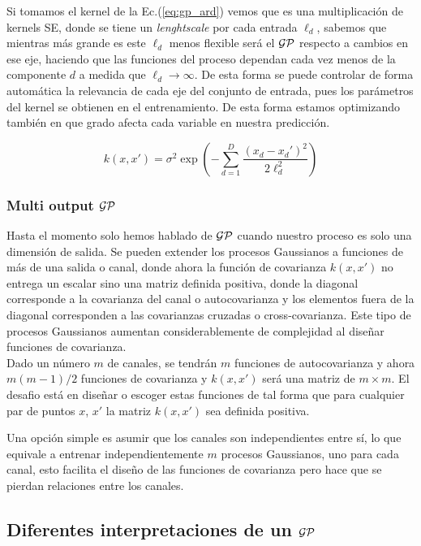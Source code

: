 Si tomamos el kernel de la Ec.(\ref{eq:gp_ard}) vemos que es una multiplicación de kernels SE, donde se tiene un \textit{lenghtscale} por cada entrada $\ell_d$, sabemos que mientras más grande es este $\ell_d$ menos flexible será el $\mathcal{GP}$ respecto a cambios en ese eje, haciendo que las funciones del proceso dependan cada vez menos de la componente $d$ a medida que $\ell_d \rightarrow \infty$. De esta forma se puede controlar de forma automática la relevancia de cada eje del conjunto de entrada, pues los parámetros del kernel se obtienen en el entrenamiento. De esta forma estamos optimizando también en que grado afecta cada variable en nuestra predicción.

\begin{equation}\label{eq:gp_ard}
	k(x, x') = \sigma^2 \exp\left( -\sum_{d=1}^{D} \frac{(x_d - x_d')^2}{2\ell_d^2}\right)
\end{equation}


\subsubsection{Multi output $\mathcal{GP}$}
Hasta el momento solo hemos hablado de $\mathcal{GP}$ cuando nuestro proceso es solo una dimensión de salida. Se pueden extender los procesos Gaussianos a funciones de más de una salida o canal, donde ahora la función de covarianza $k(x, x')$ no entrega un escalar sino una matriz definida positiva, donde la diagonal corresponde a la covarianza del canal o autocovarianza y los elementos fuera de la diagonal corresponden a las covarianzas cruzadas o cross-covarianza. Este tipo de procesos Gaussianos aumentan considerablemente de complejidad al diseñar funciones de covarianza.\\ 

Dado un número $m$ de canales, se tendrán $m$ funciones de autocovarianza y ahora $m(m-1)/2$ funciones de covarianza y $k(x, x')$ será una matriz de $m\times m$. El desafio está en diseñar o escoger estas funciones de tal forma que para cualquier par de puntos $x$, $x'$ la matriz $k(x, x')$ sea definida positiva.

Una opción simple es asumir que los canales son independientes entre sí, lo que equivale a entrenar independientemente $m$ procesos Gaussianos, uno para cada canal, esto facilita el diseño de las funciones de covarianza pero hace que se pierdan relaciones entre los canales.
 

\subsection{Diferentes interpretaciones de un $\mathcal{GP}$}

